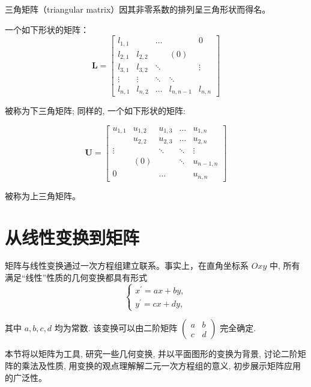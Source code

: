 \documentclass[lang=cn,newtx,10pt,scheme=chinese]{elegantbook}
\begin{document}
三角矩阵（triangular matrix）因其非零系数的排列呈三角形状而得名。

一个如下形状的矩阵：
$$
\mathbf{L}=\left[\begin{array}{ccccc}
l_{1,1} & & \ldots & & 0 \\
l_{2,1} & l_{2,2} & & (0) & \\
l_{3,1} & l_{3,2} & \ddots & & \vdots \\
\vdots & \vdots & \ddots & \ddots & \\
l_{n, 1} & l_{n, 2} & \ldots & l_{n, n-1} & l_{n, n}
\end{array}\right]
$$

被称为下三角矩阵; 同样的, 一个如下形状的矩阵:

$$
\mathbf{U}=\left[\begin{array}{ccccc}
u_{1,1} & u_{1,2} & u_{1,3} & \ldots & u_{1, n} \\
& u_{2,2} & u_{2,3} & \ldots & u_{2, n} \\
\vdots & & \ddots & \ddots & \vdots \\
& (0) & & \ddots & u_{n-1, n} \\
0 & & \ldots & & u_{n, n}
\end{array}\right]
$$

被称为上三角矩阵。

\section{从线性变换到矩阵}
\label{sec:从线性变换到矩阵}

\begin{note}
    矩阵与线性变换通过一次方程组建立联系。事实上，在直角坐标系 $O x y$ 中, 所有满足“线性”性质的几何变换都具有形式
$$
\left\{\begin{array}{l}
x^{\prime}=a x+b y, \\
y^{\prime}=c x+d y,
\end{array}\right.
$$

其中 $a, b, c, d$ 均为常数. 该变换可以由二阶矩阵 $\left(\begin{array}{ll}a & b \\ c & d\end{array}\right)$ 完全确定.
\end{note}

本节将以矩阵为工具, 研究一些几何变换, 并以平面图形的变换为背景, 讨论二阶矩阵的乘法及性质, 用变换的观点理解解二元一次方程组的意义, 初步展示矩阵应用的广泛性。
\end{document}
